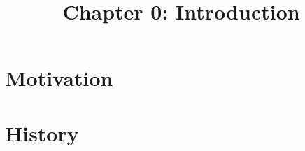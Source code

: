 \documentclass[12pt]{article}
\title{Chapter 0: Introduction}
\date{}
\begin{document}
\section{Motivation}
\section{History} 
\end{document}
